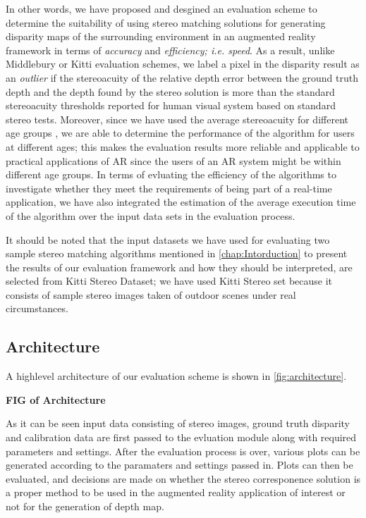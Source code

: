 In other words, we have proposed and desgined an evaluation scheme to determine the suitability of using stereo matching solutions for generating disparity maps of the surrounding 
environment in an augmented reality framework in terms of \textit{accuracy} and \textit{efficiency; i.e. speed}. 
As a result, unlike Middlebury or Kitti evaluation schemes, we label a pixel in the disparity result as an \textit{outlier} if the stereoacuity
of the relative depth error between the ground truth depth and the depth found by the stereo solution is more than the standard stereoacuity thresholds reported for human visual system based
on standard stereo tests. 
Moreover, since we have used the average stereoacuity for different age groups \cite{garn06}, we are able to determine the performance of the algorithm for users 
at different ages; this
makes the evaluation results more reliable and applicable to practical applications of AR since the users of an AR system might be within different age groups.
In terms of evluating the efficiency of the algorithms to investigate whether they meet the requirements of being part of a real-time application, 
we have also integrated the estimation of the average execution time of the algorithm over the input data sets in the evaluation process.

It should be noted that the input datasets we have used for evaluating two sample stereo matching algorithms mentioned in \ref{chap:Intorduction}
to present the results of our evaluation framework and how they should be interpreted, 
are selected from Kitti Stereo Dataset; we have used Kitti Stereo set because it consists of sample stereo images
taken of outdoor scenes under real circumstances.

\subsection{Architecture}
A highlevel architecture of our evaluation scheme is shown in \ref{fig:architecture}.

\textbf{FIG of Architecture}

As it can be seen input data consisting of stereo images, ground truth disparity and calibration data
are first passed to the evluation module along with required parameters and settings.
After the evaluation process is over, various plots can
be generated according to the paramaters and settings passed in. Plots can then be evaluated, and decisions are made on 
whether the stereo corresponence solution is a proper method to be used in the augmented reality application of interest or not for the generation of depth map.
